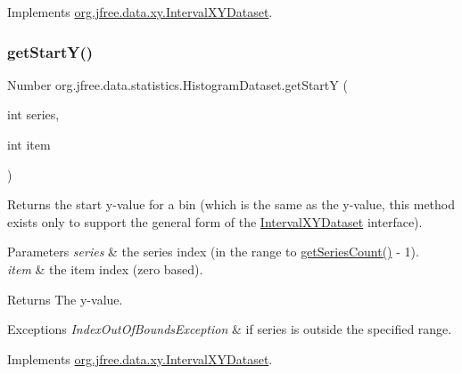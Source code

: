 Implements \mbox{\hyperlink{interfaceorg_1_1jfree_1_1data_1_1xy_1_1_interval_x_y_dataset_a7548ec7d60d72463313dc6f10aceee62}{org.\+jfree.\+data.\+xy.\+Interval\+X\+Y\+Dataset}}.

\mbox{\label{classorg_1_1jfree_1_1data_1_1statistics_1_1_histogram_dataset_aa8bbdecb3157607d7522130d08cca440}} 
\subsubsection{\texorpdfstring{get\+Start\+Y()}{getStartY()}}
{\footnotesize\ttfamily Number org.\+jfree.\+data.\+statistics.\+Histogram\+Dataset.\+get\+StartY (\begin{DoxyParamCaption}\item[{int}]{series,  }\item[{int}]{item }\end{DoxyParamCaption})}

Returns the start y-\/value for a bin (which is the same as the y-\/value, this method exists only to support the general form of the \mbox{\hyperlink{}{Interval\+X\+Y\+Dataset}} interface).


\begin{DoxyParams}{Parameters}
{\em series} & the series index (in the range {} to {\ttfamily \mbox{\hyperlink{classorg_1_1jfree_1_1data_1_1statistics_1_1_histogram_dataset_a6dd14ceca0cb3f9b3d666a2aec480f8d}{get\+Series\+Count()}} -\/ 1}). \\
\hline
{\em item} & the item index (zero based).\\
\hline
\end{DoxyParams}
\begin{DoxyReturn}{Returns}
The y-\/value.
\end{DoxyReturn}

\begin{DoxyExceptions}{Exceptions}
{\em Index\+Out\+Of\+Bounds\+Exception} & if {\ttfamily series} is outside the specified range. \\
\hline
\end{DoxyExceptions}


Implements \mbox{\hyperlink{interfaceorg_1_1jfree_1_1data_1_1xy_1_1_interval_x_y_dataset_afdd414735adb233734bc35b76a005ed9}{org.\+jfree.\+data.\+xy.\+Interval\+X\+Y\+Dataset}}.

